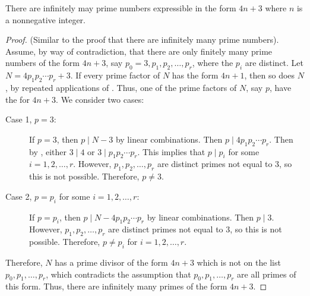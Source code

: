 \documentclass{ximera}
\begin{document}
\begin{proposition}[Proposition 1.22]\label{prop:inf-badprimes}
 There are infinitely may prime numbers expressible in the form $4n+3$ where $n$ is a nonnegative integer.
\end{proposition}
\begin{proof}
 (Similar to the proof that there are infinitely many prime numbers). Assume, by way of contradiction, that there are only finitely many prime numbers of the form $4n+3$, say $p_0=3, p_1,p_2,\dots, p_r$, where the $p_i$ are distinct. Let $N=4p_1 p_2 \cdots p_r+3$. If every prime factor of $N$ has the form $4n+1$, then so does $N$, by repeated applications of . Thus, one of the prime factors of $N$, say $p$, have the for $4n+3$. We consider two cases:
 
\begin{description}
 \item[Case 1, $p=3$:] If $p=3$, then $p\mid N-3$ by linear combinations. Then $p\mid 4 p_1p_2\cdots p_r$. Then by , either $3\mid 4$ or $3\mid p_1p_2\cdots p_r$. This implies that $p\mid p_i$ for some $i=1,2,\dots,r$. However, $p_1,p_2,\dots,p_r$ are distinct primes not equal to $3$, so this is not possible. Therefore, $p\neq 3$.
 
 \item[Case 2, $p=p_i$ for some $i=1,2,\dots, r$:] If $p=p_i$, then $p\mid N-4p_1p_2\cdots p_r$ by linear combinations. Then $p\mid 3$. However, $p_1,p_2,\dots,p_r$ are distinct primes not equal to $3$, so this is not possible. Therefore, $p\neq p_i$ for $i=1,2,\dots,r$.
\end{description}
Therefore, $N$ has a prime divisor of the form $4n+3$ which is not on the list $p_0,p_1,\dots,p_r$, which contradicts the assumption that $p_0,p_1,\dots,p_r$ are all primes of this form. Thus, there are infinitely many primes of the form $4n+3$.
\end{proof}

\end{document}
